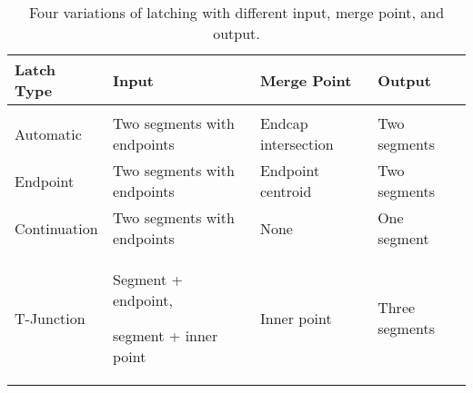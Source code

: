 
\begin{table}%
\centering
\begin{tabular}{p{2.5cm}| p{5.4cm} | p{3.5cm} | p{3cm}}
\textbf{Latch Type} & \textbf{Input} & \textbf{Merge Point} & \textbf{Output} \\
\hline
& & & \\

Automatic &

Two segments with endpoints & 

Endcap intersection &

Two segments

\\ 

Endpoint &

Two segments with endpoints & 

Endpoint centroid &

Two segments

\\ 

Continuation &

Two segments with endpoints & 

None &

One segment

\\ 

T-Junction &

Segment + endpoint, \par segment + inner point & 

Inner point &

Three segments

\\ 

\end{tabular}
\caption[Summary of latching]{Four variations of latching with
  different input, merge point, and output.}
\label{tab:latch}
\end{table}
